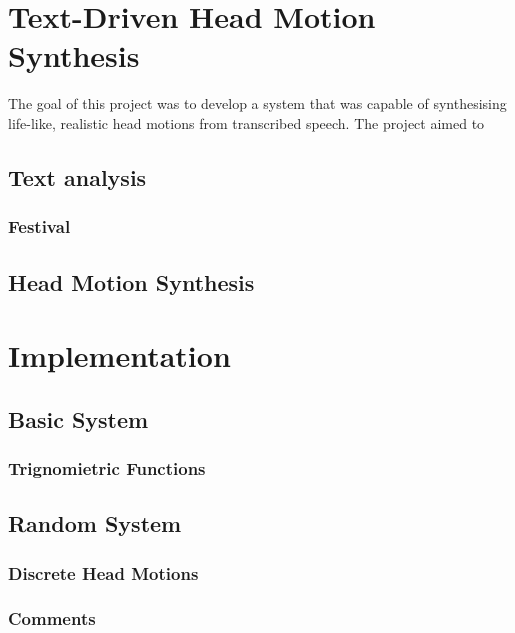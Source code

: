 \documentclass[bsc,frontabs,twoside,singlespacing,parskip]{infthesis}
\begin{document}
\chapter{Text-Driven Head Motion Synthesis}


The goal of this project was to develop a system that was capable of synthesising life-like, realistic head motions from transcribed speech. The project aimed to 
\section{Text analysis}
\subsection{Festival}

\section{Head Motion Synthesis}

\chapter{Implementation}

\section{Basic System}
\subsection{Trignomietric Functions}

\section{Random System}
\subsection{Discrete Head Motions}
\subsection{Comments}
\end{document}
